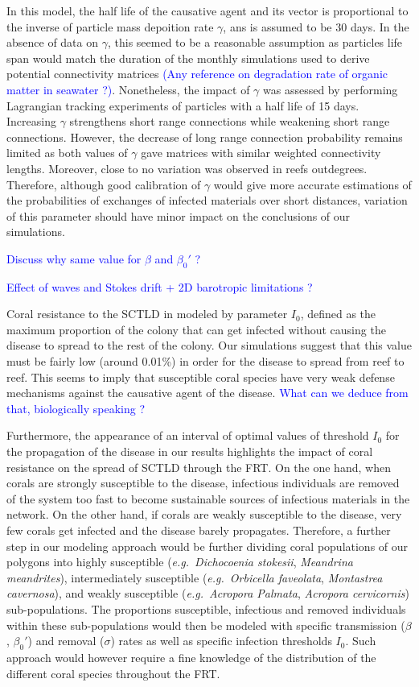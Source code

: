 \documentclass[utf8]{frontiersSCNS}
\newcommand{\eg}{{\it e.g.}\ }
\begin{document}
In this model, the half life of the causative agent and its vector is proportional to the inverse of
particle mass depoition rate $\gamma$, ans is assumed to be 30 days. In the absence of data on $\gamma$, this seemed to be a reasonable assumption as particles life span would match the duration of the monthly simulations used to derive potential connectivity matrices \textcolor{blue}{(Any reference on degradation rate of organic matter in seawater ?)}. Nonetheless, the impact of $\gamma$ was assessed by performing Lagrangian tracking experiments of particles with a half life of 15 days. Increasing $\gamma$ strengthens short range connections while weakening short range connections. However, the decrease of long range connection probability remains limited as both values of $\gamma$ gave matrices with similar weighted connectivity lengths. Moreover, close to no variation was observed in reefs outdegrees. Therefore, although good calibration of $\gamma$ would give more accurate estimations of the probabilities of exchanges of infected materials over short distances, variation of this parameter should have minor impact on the conclusions of our simulations.

\textcolor{blue}{Discuss why same value for $\beta$ and $\beta_0'$ ?}

\textcolor{blue}{Effect of waves and Stokes drift + 2D barotropic limitations ?}

Coral resistance to the SCTLD in modeled by parameter $I_0$, defined as the maximum proportion of the colony that can get infected without causing the disease to spread to the rest of the colony. Our simulations suggest that this value must be fairly low (around 0.01\%) in order for the disease to spread from reef to reef. This seems to imply that susceptible coral species have very weak defense mechanisms against the causative agent of the disease. \textcolor{blue}{What can we deduce from that, biologically speaking ?}

Furthermore, the appearance of an interval of optimal values of threshold $I_0$ for the propagation of the disease in our results highlights the impact of coral resistance on the spread of SCTLD through the FRT. On the one hand, when corals are strongly susceptible to the disease, infectious individuals are removed of the system too fast to become sustainable sources of infectious materials in the network. On the other hand, if corals are weakly susceptible to the disease, very few corals get infected and the disease barely propagates. Therefore, a further step in our modeling approach would be further dividing coral populations of our polygons into highly susceptible (\eg \textit{Dichocoenia stokesii}, \textit{Meandrina meandrites}), intermediately susceptible (\eg \textit{Orbicella faveolata}, \textit{Montastrea cavernosa}), and weakly susceptible (\eg \textit{Acropora Palmata}, \textit{Acropora cervicornis}) sub-populations. The proportions susceptible, infectious and removed individuals within these sub-populations would then be modeled with specific transmission ($\beta$, $\beta_0'$) and removal ($\sigma$) rates as well as specific infection thresholds $I_0$. Such approach would however require a fine knowledge of the distribution of the different coral species throughout the FRT. 
\end{document}
